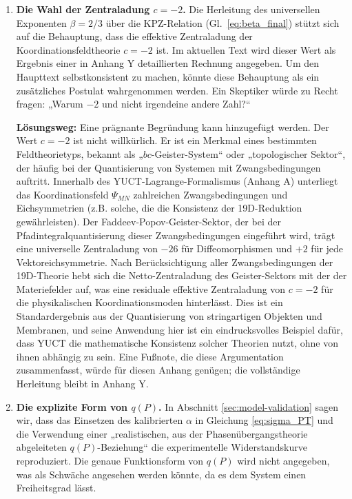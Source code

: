 \documentclass[12pt,a4paper]{article}
\theoremstyle{remark}
\begin{document}
	\begin{enumerate}
		\item \textbf{Die Wahl der Zentraladung \(c = -2\).} Die Herleitung des universellen Exponenten \(\beta = 2/3\) über die KPZ-Relation (Gl.~\ref{eq:beta_final}) stützt sich auf die Behauptung, dass die effektive Zentraladung der Koordinationsfeldtheorie \(c = -2\) ist. Im aktuellen Text wird dieser Wert als Ergebnis einer in Anhang Y detaillierten Rechnung angegeben. Um den Haupttext selbstkonsistent zu machen, könnte diese Behauptung als ein zusätzliches Postulat wahrgenommen werden. Ein Skeptiker würde zu Recht fragen: „Warum \(-2\) und nicht irgendeine andere Zahl?“
		
		\textbf{Lösungsweg:} Eine prägnante Begründung kann hinzugefügt werden. Der Wert \(c = -2\) ist nicht willkürlich. Er ist ein Merkmal eines bestimmten Feldtheorietyps, bekannt als „\(bc\)-Geister-System“ oder „topologischer Sektor“, der häufig bei der Quantisierung von Systemen mit Zwangsbedingungen auftritt. Innerhalb des YUCT-Lagrange-Formalismus (Anhang A) unterliegt das Koordinationsfeld \(\Psi_{MN}\) zahlreichen Zwangsbedingungen und Eichsymmetrien (z.B. solche, die die Konsistenz der 19D-Reduktion gewährleisten). Der Faddeev-Popov-Geister-Sektor, der bei der Pfadintegralquantisierung dieser Zwangsbedingungen eingeführt wird, trägt eine universelle Zentraladung von \(-26\) für Diffeomorphismen und \(+2\) für jede Vektoreichsymmetrie. Nach Berücksichtigung aller Zwangsbedingungen der 19D-Theorie hebt sich die Netto-Zentraladung des Geister-Sektors mit der der Materiefelder auf, was eine residuale effektive Zentraladung von \(c = -2\) für die physikalischen Koordinationsmoden hinterlässt. Dies ist ein Standardergebnis aus der Quantisierung von stringartigen Objekten und Membranen, und seine Anwendung hier ist ein eindrucksvolles Beispiel dafür, dass YUCT die mathematische Konsistenz solcher Theorien nutzt, ohne von ihnen abhängig zu sein. Eine Fußnote, die diese Argumentation zusammenfasst, würde für diesen Anhang genügen; die vollständige Herleitung bleibt in Anhang Y.
		
		\item \textbf{Die explizite Form von \(q(P)\).} In Abschnitt \ref{sec:model-validation} sagen wir, dass das Einsetzen des kalibrierten \(\alpha\) in Gleichung \eqref{eq:sigma_PT} und die Verwendung einer „realistischen, aus der Phasenübergangstheorie abgeleiteten \(q(P)\)-Beziehung“ die experimentelle Widerstandskurve reproduziert. Die genaue Funktionsform von \(q(P)\) wird nicht angegeben, was als Schwäche angesehen werden könnte, da es dem System einen Freiheitsgrad lässt.
		

\end{enumerate}
\end{document}
